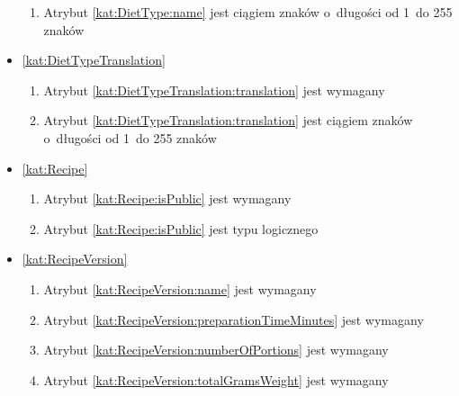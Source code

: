 \begin{itemize}[label={\textbf{Ograniczenia dla}}, wide, labelwidth=!, labelindent=0pt]
\begin{enumerate}[label={\textbf{OGR/\protect\threedigits{\arabic{enumi}}}}, wide, labelwidth=!, align=left, leftmargin=3cm, resume]
        \item Atrybut \ref{kat:DietType:name} jest ciągiem znaków o~długości od 1~do 255 znaków
    \end{enumerate}

    \item\ref{kat:DietTypeTranslation}
    \begin{enumerate}[label={\textbf{OGR/\protect\threedigits{\arabic{enumi}}}}, wide, labelwidth=!, align=left, leftmargin=3cm, resume]
        \item Atrybut \ref{kat:DietTypeTranslation:translation} jest wymagany

        \item Atrybut \ref{kat:DietTypeTranslation:translation} jest ciągiem znaków o~długości od 1~do 255 znaków
    \end{enumerate}

    \item\ref{kat:Recipe}
    \begin{enumerate}[label={\textbf{OGR/\protect\threedigits{\arabic{enumi}}}}, wide, labelwidth=!, align=left, leftmargin=3cm, resume]
        \item Atrybut \ref{kat:Recipe:isPublic} jest wymagany

        \item Atrybut \ref{kat:Recipe:isPublic} jest typu logicznego
    \end{enumerate}

    \item\ref{kat:RecipeVersion}
    \begin{enumerate}[label={\textbf{OGR/\protect\threedigits{\arabic{enumi}}}}, wide, labelwidth=!, align=left, leftmargin=3cm, resume]
        \item Atrybut \ref{kat:RecipeVersion:name} jest wymagany
        \item Atrybut \ref{kat:RecipeVersion:preparationTimeMinutes} jest wymagany
        \item Atrybut \ref{kat:RecipeVersion:numberOfPortions} jest wymagany
        \item Atrybut \ref{kat:RecipeVersion:totalGramsWeight} jest wymagany


\end{enumerate}
\end{itemize}
